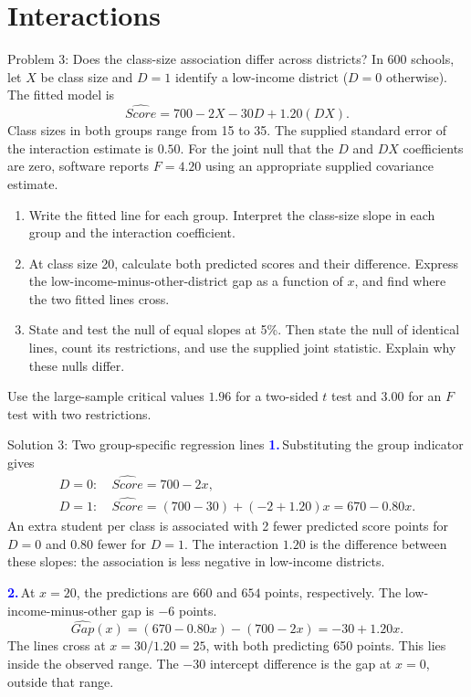 \documentclass[notes,10pt, aspectratio=169]{beamer}
\newif\ifshowsolutions
\newcommand{\answerpart}[1]{\textcolor{blue}{\textbf{#1.}}\,}
\begin{document}
\section{Interactions}
\begin{frame}{Problem 3: Does the class-size association differ across districts?}
\small
In 600 schools, let $X$ be class size and $D=1$ identify a low-income district ($D=0$ otherwise). The fitted model is
\[
\widehat{Score}=700-2X-30D+1.20(DX).
\]
Class sizes in both groups range from 15 to 35. The supplied standard error of the interaction estimate is $0.50$. For the joint null that the $D$ and $DX$ coefficients are zero, software reports $F=4.20$ using an appropriate supplied covariance estimate.
\begin{enumerate}
\item Write the fitted line for each group. Interpret the class-size slope in each group and the interaction coefficient.
\item At class size 20, calculate both predicted scores and their difference. Express the low-income-minus-other-district gap as a function of $x$, and find where the two fitted lines cross.
\item State and test the null of equal slopes at 5\%. Then state the null of identical lines, count its restrictions, and use the supplied joint statistic. Explain why these nulls differ.
\end{enumerate}
Use the large-sample critical values $1.96$ for a two-sided $t$ test and $3.00$ for an $F$ test with two restrictions.
\end{frame}

\ifshowsolutions
\begin{frame}{Solution 3: Two group-specific regression lines}
\small
\answerpart{1}Substituting the group indicator gives
\[
\begin{aligned}
D=0:\ &\widehat{Score}=700-2x,\\
D=1:\ &\widehat{Score}=(700-30)+(-2+1.20)x=670-0.80x.
\end{aligned}
\]
An extra student per class is associated with 2 fewer predicted score points for $D=0$ and 0.80 fewer for $D=1$. The interaction $1.20$ is the difference between these slopes: the association is less negative in low-income districts.
\par\medskip
\answerpart{2}At $x=20$, the predictions are $660$ and $654$ points, respectively. The low-income-minus-other gap is $-6$ points.
\[
\widehat{Gap}(x)=(670-0.80x)-(700-2x)=-30+1.20x.
\]
The lines cross at $x=30/1.20=25$, with both predicting 650 points. This lies inside the observed range. The $-30$ intercept difference is the gap at $x=0$, outside that range.
\end{frame}
\end{document}
